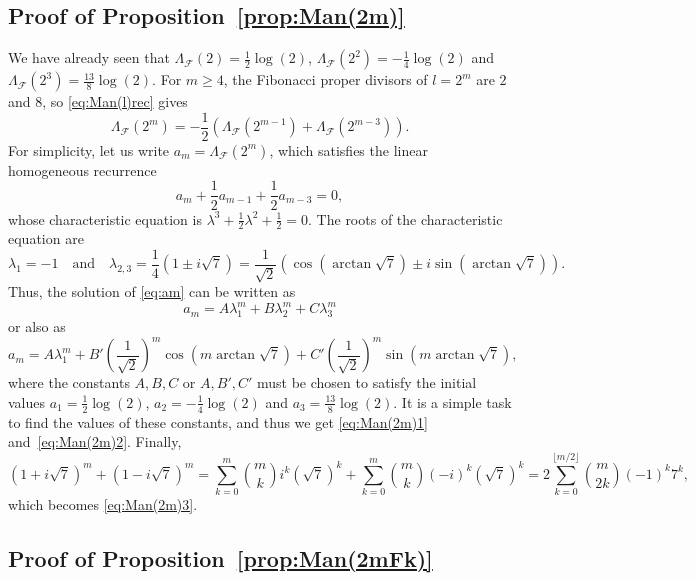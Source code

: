 \documentclass[11pt, a4paper]{article}
\newcommand{\manF}{\Lambda_{\mathcal{F}}}
\theoremstyle{plain}
\theoremstyle{definition}
\begin{document}
\subsection{Proof of Proposition~\ref{prop:Man(2m)}}

We have already seen that $\manF(2) = \frac{1}{2} \log(2)$, 
$\manF(2^2) = -\frac{1}{4} \log(2)$ and $\manF(2^3) = \frac{13}{8} \log(2)$.
For $m \ge 4$, the Fibonacci proper divisors of $l= 2^m$ are $2$ and $8$, 
so \eqref{eq:Man(l)rec} gives
\[
\manF(2^m) = -\frac{1}{2} \left( \manF(2^{m-1}) + \manF(2^{m-3}) \right).
\]
For simplicity, let us write $a_m = \manF(2^m)$, which satisfies the linear homogeneous recurrence 
\begin{equation}
\label{eq:am}
a_m + \frac{1}{2} a_{m-1} + \frac{1}{2} a_{m-3} = 0,
\end{equation}
whose characteristic equation is $\lambda^3 + \frac{1}{2} \lambda^2 + \frac{1}{2} = 0$.
The roots of the characteristic equation are 
\[
\lambda_1 = -1 \quad\text{and}\quad
\lambda_{2,3} = \frac{1}{4}\left(1 \pm i\sqrt{7}\right) 
= \frac{1}{\sqrt{2}} \left(\cos(\arctan\sqrt{7}) \pm i \sin(\arctan\sqrt{7}) \right).
\] 
Thus, the solution of \eqref{eq:am} can be written as
\[
a_m = A \lambda_1^m + B \lambda_2^m + C \lambda_3^m
\]
or also as
\[
a_m = A \lambda_1^m + B' \left(\frac{1}{\sqrt{2}}\right)^m \cos(m\arctan\sqrt{7}) 
+ C' \left(\frac{1}{\sqrt{2}}\right)^m \sin(m\arctan\sqrt{7}),
\]
where the constants $A,B,C$ or $A,B',C'$ must be chosen to satisfy the initial values
$a_1 = \frac{1}{2} \log(2)$, $a_2 = -\frac{1}{4} \log(2)$ and $a_3 = \frac{13}{8} \log(2)$.
It is a simple task to find the values of these constants, and thus we get \eqref{eq:Man(2m)1} and~\eqref{eq:Man(2m)2}. 
Finally, 
\[
(1 + i \sqrt{7})^m + (1 - i \sqrt{7})^m
= \sum_{k=0}^{m} \binom{m}{k} i^k (\sqrt{7})^k + \sum_{k=0}^{m} \binom{m}{k} (-i)^k (\sqrt{7})^k
= 2 \sum_{k=0}^{\lfloor m/2 \rfloor} \binom{m}{2k} (-1)^k 7^k,
\]
which becomes \eqref{eq:Man(2m)3}.

\subsection{Proof of Proposition~\ref{prop:Man(2mFk)}}
\end{document}
